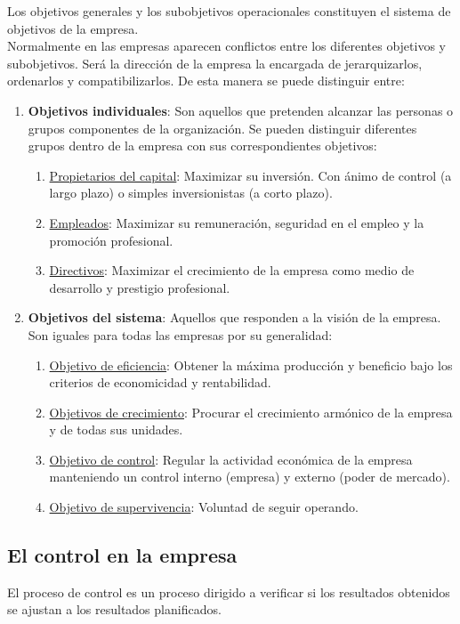 \documentclass[12pt]{article}
\theoremstyle{definition_wo_parentheses}
\begin{document}
Los objetivos generales y los subobjetivos operacionales constituyen el sistema de objetivos de la empresa.\\
Normalmente en las empresas aparecen conflictos entre los diferentes objetivos y subobjetivos. Será la dirección de la empresa la encargada de jerarquizarlos, ordenarlos y compatibilizarlos. De esta manera se puede distinguir entre:
\begin{enumerate}
\item \textbf{Objetivos individuales}: Son aquellos que pretenden alcanzar las personas o grupos componentes de la organización. Se pueden distinguir diferentes grupos dentro de la empresa con sus correspondientes objetivos:
\begin{enumerate}
\item \underline{Propietarios del capital}: Maximizar su inversión. Con ánimo de control (a largo plazo) o simples inversionistas (a corto plazo).
\item \underline{Empleados}: Maximizar su remuneración, seguridad en el empleo y la promoción profesional.
\item \underline{Directivos}: Maximizar el crecimiento de la empresa como medio de desarrollo y prestigio profesional.
\end{enumerate}
\item \textbf{Objetivos del sistema}: Aquellos que responden a la visión de la empresa. Son iguales para todas las empresas por su generalidad:
\begin{enumerate}
\item \underline{Objetivo de eficiencia}: Obtener la máxima producción y beneficio bajo los criterios de economicidad y rentabilidad.
\item \underline{Objetivos de crecimiento}: Procurar el crecimiento armónico de la empresa y de todas sus unidades.
\item \underline{Objetivo de control}: Regular la actividad económica de la empresa manteniendo un control interno (empresa) y externo (poder de mercado).
\item \underline{Objetivo de supervivencia}: Voluntad de seguir operando.
\end{enumerate}
\end{enumerate}

\subsection{El control en la empresa}
El proceso de control es un proceso dirigido a verificar si los resultados obtenidos se ajustan a los resultados planificados.\\
\end{document}
